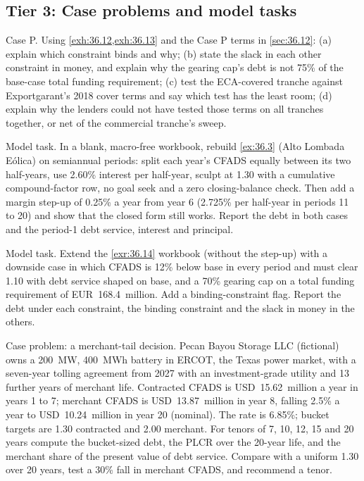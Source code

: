 \subsection*{Tier 3: Case problems and model tasks}

\begin{exercise}\label{exr:36.13}
Case P. Using \cref{exh:36.12,exh:36.13} and the Case P terms in \cref{sec:36.12}: (a) explain which constraint binds and why; (b) state the slack in each other constraint in money, and explain why the gearing cap's debt is not 75\% of the base-case total funding requirement; (c) test the ECA-covered tranche against Exportgarant's 2018 cover terms and say which test has the least room; (d) explain why the lenders could not have tested those terms on all tranches together, or net of the commercial tranche's sweep.
\end{exercise}

\begin{exercise}\label{exr:36.14}
Model task. In a blank, macro-free workbook, rebuild \cref{ex:36.3} (Alto Lombada Eólica) on semiannual periods: split each year's CFADS equally between its two half-years, use 2.60\% interest per half-year, sculpt at 1.30\x{} with a cumulative compound-factor row, no goal seek and a zero closing-balance check. Then add a margin step-up of 0.25\% a year from year 6 (2.725\% per half-year in periods 11 to 20) and show that the closed form still works. Report the debt in both cases and the period-1 debt service, interest and principal.
\end{exercise}

\begin{exercise}\label{exr:36.15}
Model task. Extend the \cref{exr:36.14} workbook (without the step-up) with a downside case in which CFADS is 12\% below base in every period and must clear 1.10\x{} with debt service shaped on base, and a 70\% gearing cap on a total funding requirement of EUR~168.4~million. Add a binding-constraint flag. Report the debt under each constraint, the binding constraint and the slack in money in the others.
\end{exercise}

\begin{exercise}\label{exr:36.16}
Case problem: a merchant-tail decision. Pecan Bayou Storage LLC (fictional) owns a 200~MW, 400~MWh battery in ERCOT, the Texas power market, with a seven-year tolling agreement from 2027 with an investment-grade utility and 13 further years of merchant life. Contracted CFADS is USD~15.62~million a year in years 1 to 7; merchant CFADS is USD~13.87~million in year 8, falling 2.5\% a year to USD~10.24~million in year 20 (nominal). The rate is 6.85\%; bucket targets are 1.30\x{} contracted and 2.00\x{} merchant. For tenors of 7, 10, 12, 15 and 20 years compute the bucket-sized debt, the PLCR over the 20-year life, and the merchant share of the present value of debt service. Compare with a uniform 1.30\x{} over 20 years, test a 30\% fall in merchant CFADS, and recommend a tenor.
\end{exercise}

